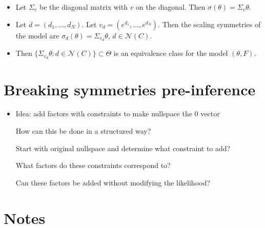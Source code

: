 \documentclass{article}
\begin{document}
\begin{itemize}

\item
Let $\Sigma_v$ be the diagonal matrix with $v$ on the diagonal. Then $\sigma(\theta)=\Sigma_v\theta$.

\item
Let $d=(d_1,...,d_N)$. Let $v_d = (e^{d_1},...,e^{d_N})$. Then the scaling symmetries of the model are $\sigma_{d}(\theta)=\Sigma_{v_d}\theta$, $d\in\mathcal{N}(C)$.

\item
Then $\{\Sigma_{v_d}\theta:d\in\mathcal{N}(C)\}\subset\Theta$ is an equivalence class for the model $(\theta,F)$.

\end{itemize}

\section{Breaking symmetries pre-inference}

\begin{itemize}

\item
Idea: add factors with constraints to make nullspace the 0 vector

How can this be done in a structured way?

Start with original nullspace and determine what constraint to add?

What factors do these constraints correspond to?

Can these factors be added without modifying the likelihood?


\end{itemize}


\section{Notes}
\end{document}
